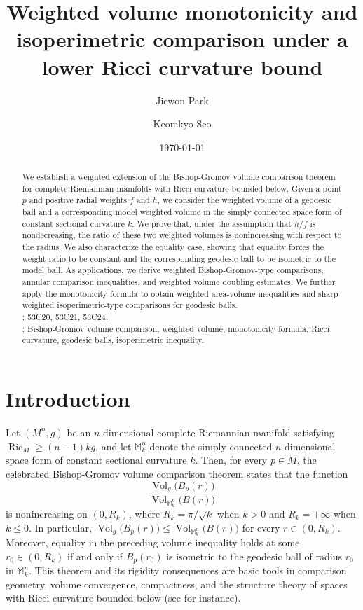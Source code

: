 \documentclass[11pt]{article}
\title{Weighted volume monotonicity and isoperimetric comparison under a lower Ricci curvature bound}
\author{Jiewon Park \and Keomkyo Seo}
\date{\today}
\newcommand{\Ric}{\operatorname{Ric}}
\newcommand{\Vol}{\operatorname{Vol}}
\begin{document}
\maketitle


\begin{abstract}
We establish a weighted extension of the Bishop-Gromov volume comparison theorem for complete Riemannian manifolds with Ricci curvature bounded below. Given a point $p$ and positive radial weights $f$ and $h$, we consider the weighted volume of a geodesic ball and a corresponding model weighted volume in the simply connected space form of constant sectional curvature $k$. We prove that, under the assumption that $h/f$ is nondecreasing, the ratio of these two weighted volumes is nonincreasing with respect to the radius. We also characterize the equality case, showing that equality forces the weight ratio to be constant and the corresponding geodesic ball to be isometric to the model ball. As applications, we derive weighted Bishop-Gromov-type comparisons, annular comparison inequalities, and weighted volume doubling estimates. We further apply the monotonicity formula to obtain weighted area-volume inequalities and sharp weighted isoperimetric-type comparisons for geodesic balls.
\\

: 53C20, 53C21, 53C24. \\
: Bishop-Gromov volume comparison, weighted volume, monotonicity formula, Ricci curvature, geodesic balls, isoperimetric inequality.
\end{abstract}


\section{Introduction}

Let $(M^n,g)$ be an $n$-dimensional complete Riemannian manifold satisfying $\Ric_M\geq (n-1)kg$, and let $\mathbb M_k^n$ denote the simply connected $n$-dimensional space form of constant sectional curvature $k$. Then, for every $p\in M$, the celebrated Bishop-Gromov volume comparison theorem states that the function 
$$
\frac{\Vol_g\bigl(B_p(r)\bigr)}{\Vol_{\mathbb M_k^n}\bigl(B(r)\bigr)}
$$
is nonincreasing on $(0,R_k)$, where $R_k=\pi/\sqrt{k}$ when $k>0$ and $R_k=+\infty$ when $k\leq0$. In particular, $\Vol_g\bigl(B_p(r)\bigr)\leq\Vol_{\mathbb M_k^n}\bigl(B(r)\bigr)$ for every $r\in(0,R_k)$. Moreover, equality in the preceding volume inequality holds at some $r_0\in(0,R_k)$ if and only if $B_p(r_0)$ is isometric to the geodesic ball of radius $r_0$ in $\mathbb M_k^n$. This theorem and its rigidity consequences are basic tools in comparison geometry, volume convergence, compactness, and the structure theory of spaces with Ricci curvature bounded below (see  \cite{BishopCrittenden,CheegerColding,ColdingVolume,Gromov} for instance).
\end{document}
